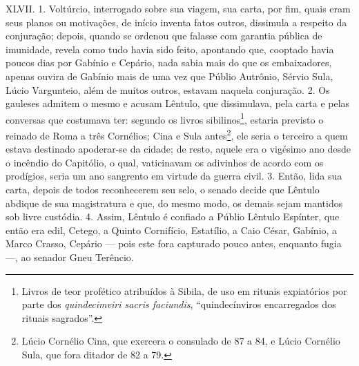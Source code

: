 XLVII. 1. Voltúrcio, interrogado sobre sua viagem, sua carta, por fim, quais
eram seus planos ou motivações, de início inventa fatos outros, dissimula a
respeito da conjuração; depois, quando se ordenou que falasse com garantia
pública de imunidade, revela como tudo havia sido feito, apontando que,
cooptado havia poucos dias por Gabínio e Cepário, nada sabia mais do que os
embaixadores, apenas ouvira de Gabínio mais de uma vez que Públio Autrônio,
Sérvio Sula, Lúcio Vargunteio, além de muitos outros, estavam naquela
conjuração. 2. Os gauleses admitem o mesmo e acusam Lêntulo, que dissimulava,
pela carta e pelas conversas que costumava ter: segundo os livros
sibilinos\footnote{Livros de teor profético atribuídos à Sibila, de  uso em
rituais expiatórios por parte dos \emph{quindecimviri sacris faciundis},
``quindecínviros encarregados dos rituais sagrados''.}, estaria previsto o
reinado de Roma a três Cornélios; Cina e Sula antes\footnote{Lúcio Cornélio
Cina, que exercera o consulado de 87 a 84, e Lúcio Cornélio Sula, que fora
ditador de 82 a 79.}, ele seria o terceiro a quem estava destinado apoderar-se
da cidade; de resto, aquele era o vigésimo ano desde o incêndio do Capitólio, o
qual, vaticinavam os adivinhos de acordo com os prodígios, seria um ano
sangrento em virtude da guerra civil. 3. Então, lida sua carta, depois de todos
reconhecerem seu selo, o senado decide que Lêntulo abdique de sua magistratura
e que, do mesmo modo, os demais sejam mantidos sob livre custódia. 4. Assim,
Lêntulo é confiado a Públio Lêntulo Espínter, que então era edil, Cetego, a
Quinto Cornifício, Estatílio, a Caio César, Gabínio, a Marco Crasso, Cepário
--- pois este fora capturado pouco antes, enquanto fugia ---, ao senador Gneu
Terêncio.

